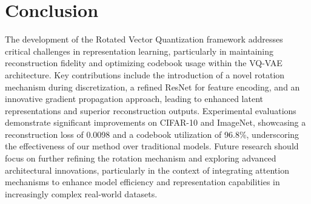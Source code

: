 \section{Conclusion}

The development of the Rotated Vector Quantization framework addresses critical challenges in representation learning, particularly in maintaining reconstruction fidelity and optimizing codebook usage within the VQ-VAE architecture. Key contributions include the introduction of a novel rotation mechanism during discretization, a refined ResNet for feature encoding, and an innovative gradient propagation approach, leading to enhanced latent representations and superior reconstruction outputs. Experimental evaluations demonstrate significant improvements on CIFAR-10 and ImageNet, showcasing a reconstruction loss of 0.0098 and a codebook utilization of 96.8\%, underscoring the effectiveness of our method over traditional models. Future research should focus on further refining the rotation mechanism and exploring advanced architectural innovations, particularly in the context of integrating attention mechanisms to enhance model efficiency and representation capabilities in increasingly complex real-world datasets.